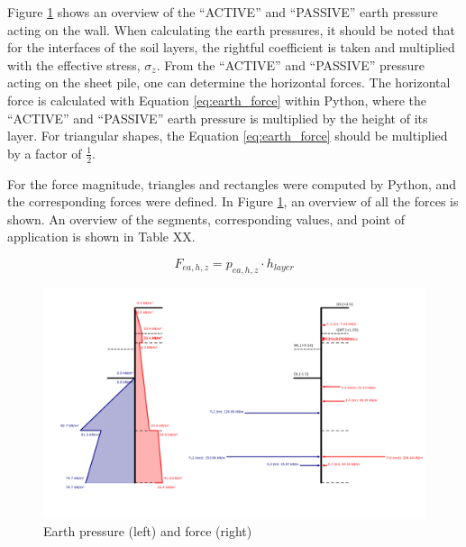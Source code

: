 Figure \ref{fig:earth_pressure} shows an overview of the “ACTIVE” and “PASSIVE” earth pressure acting on the wall. When calculating the earth pressures, it should be noted that for the interfaces of the soil layers, the rightful coefficient is taken and multiplied with the effective stress, $\sigma_{z}$. From the “ACTIVE” and “PASSIVE” pressure acting on the sheet pile, one can determine the horizontal forces. The horizontal force is calculated with Equation \ref{eq:earth_force} within Python, where the “ACTIVE” and “PASSIVE” earth pressure is multiplied by the height of its layer. For triangular shapes, the Equation \ref{eq:earth_force} should be multiplied by a factor of $\frac{1}{2}$.

For the force magnitude, triangles and rectangles were computed by Python, and the corresponding forces were defined. In Figure \ref{fig:earth_pressure}, an overview of all the forces is shown. An overview of the segments, corresponding values, and point of application is shown in Table XX.

\begin{equation}
    F_{ea,h,z} = p_{ea,h,z} \cdot h_{layer}
    \label{eq:earth_force}
\end{equation}

\begin{figure}[H]
    \centering
    \includegraphics[width=0.75\linewidth]{figures/ch8/earth_pressure_force.png}
    \caption{Earth pressure (left) and force (right)}
    \label{fig:earth_pressure}
\end{figure}


